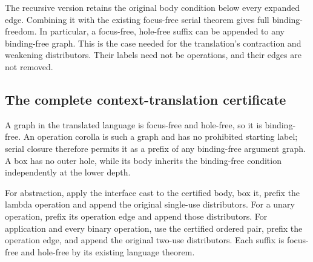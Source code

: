 The recursive version retains the original body condition below every
expanded edge. Combining it with the existing focus-free serial theorem
gives full binding-freedom. In particular, a focus-free, hole-free suffix
can be appended to any binding-free graph. This is the case needed for
the translation's contraction and weakening distributors. Their labels
need not be operations, and their edges are not removed.









\subsection{The complete context-translation certificate}


A graph in the translated language is focus-free and hole-free, so it is
binding-free. An operation corolla is such a graph and has no prohibited
starting label; serial closure therefore permits it as a prefix of any
binding-free argument graph. A box has no outer hole, while its body inherits
the binding-free condition independently at the lower depth.

For abstraction, apply the interface cast to the certified body, box it,
prefix the lambda operation and append the original single-use distributors.
For a unary operation, prefix its operation edge and append those distributors.
For application and every binary operation, use the certified ordered pair,
prefix the operation edge, and append the original two-use distributors.
Each suffix is focus-free and hole-free by its existing language theorem.











